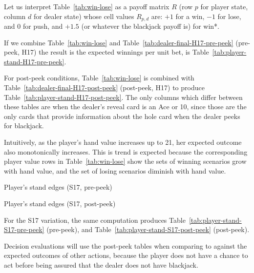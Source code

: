 Let us interpret Table~\ref{tab:win-lose} as a payoff matrix $R$
(row $p$ for player state, column $d$ for dealer state)
whose cell values $R_{p,d}$ are:
$+1$ for a win, $-1$ for lose, and $0$ for push, 
and $+1.5$ (or whatever the blackjack payoff is) for win*.

If we combine Table~\ref{tab:win-lose} and
Table~\ref{tab:dealer-final-H17-pre-peek} (pre-peek, H17) 
the result is the expected winnings per unit bet, 
is Table~\ref{tab:player-stand-H17-pre-peek}.

For post-peek conditions, Table~\ref{tab:win-lose} is combined with
Table~\ref{tab:dealer-final-H17-post-peek} (post-peek, H17) to produce
Table~\ref{tab:player-stand-H17-post-peek}.
The only columns which differ between these tables are when
the dealer's reveal card is an Ace or 10, since those are the only cards
that provide information about the hole card
when the dealer peeks for blackjack.

Intuitively, as the player's hand value increases up to 21, 
her expected outcome also monotonically increases.
This is trend is expected because the corresponding player value rows in
Table~\ref{tab:win-lose} show the sets of winning scenarios
grow with hand value, and the set of losing scenarios diminish with
hand value.  

\begin{table}[ht!]
\caption{Player's stand edges (S17, pre-peek)}
\begin{center}

\end{center}
\label{tab:player-stand-S17-pre-peek}
\end{table}

\begin{table}[ht!]
\caption{Player's stand edges (S17, post-peek)}
\begin{center}

\end{center}
\label{tab:player-stand-S17-post-peek}
\end{table}

For the S17 variation, the same computation produces
Table~\ref{tab:player-stand-S17-pre-peek} (pre-peek), and
Table~\ref{tab:player-stand-S17-post-peek} (post-peek).

Decision evaluations will use the post-peek tables when
comparing to against the expected outcomes of other actions, 
because the player does not have a chance to act before
being assured that the dealer does not have blackjack.  

